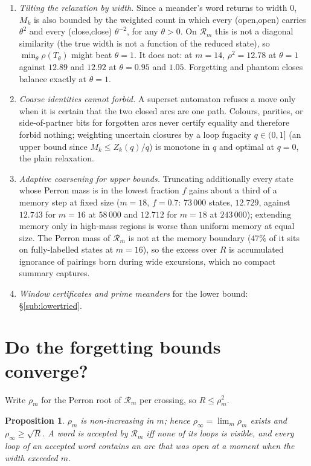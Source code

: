\documentclass[11pt]{amsart}
\newtheorem{proposition}[theorem]{Proposition}
\theoremstyle{definition}
\newcommand{\Rel}{\mathcal R}
\begin{document}
\begin{enumerate}[leftmargin=*]
\item \emph{Tilting the relaxation by width.} Since a meander's word returns to width $0$, $M_k$ is also bounded by the weighted count in which every (open,open) carries $\theta^2$ and every (close,close) $\theta^{-2}$, for any $\theta>0$. On $\Rel_m$ this is not a diagonal similarity (the true width is not a function of the reduced state), so $\min_\theta\rho(T_\theta)$ might beat $\theta=1$. It does not: at $m=14$, $\rho^2=12.78$ at $\theta=1$ against $12.89$ and $12.92$ at $\theta=0.95$ and $1.05$. Forgetting and phantom closes balance exactly at $\theta=1$.
\item \emph{Coarse identities cannot forbid.} A superset automaton refuses a move only when it is certain that the two closed arcs are one path. Colours, parities, or side-of-partner bits for forgotten arcs never certify equality and therefore forbid nothing; weighting uncertain closures by a loop fugacity $q\in(0,1]$ (an upper bound since $M_k\le Z_k(q)/q$) is monotone in $q$ and optimal at $q=0$, the plain relaxation.
\item \emph{Adaptive coarsening for upper bounds.} Truncating additionally every state whose Perron mass is in the lowest fraction $f$ gains about a third of a memory step at fixed size ($m=18$, $f=0.7$: $73\,000$ states, $12.729$, against $12.743$ for $m=16$ at $58\,000$ and $12.712$ for $m=18$ at $243\,000$); extending memory only in high-mass regions is worse than uniform memory at equal size. The Perron mass of $\Rel_m$ is not at the memory boundary ($47\%$ of it sits on fully-labelled states at $m=16$), so the excess over $R$ is accumulated ignorance of pairings born during wide excursions, which no compact summary captures.
\item \emph{Window certificates and prime meanders} for the lower bound: \S\ref{sub:lowertried}.
\end{enumerate}

\section{Do the forgetting bounds converge?}\label{sec:convergence}

Write $\rho_m$ for the Perron root of $\Rel_m$ per crossing, so $R\le\rho_m^2$.

\begin{proposition}\label{prop:mono}
$\rho_m$ is non-increasing in $m$; hence $\rho_\infty=\lim_m\rho_m$ exists and $\rho_\infty\ge\sqrt R$. A word is accepted by $\Rel_m$ iff none of its loops is \emph{visible}, and every loop of an accepted word contains an arc that was open at a moment when the width exceeded $m$.
\end{proposition}
\end{document}
